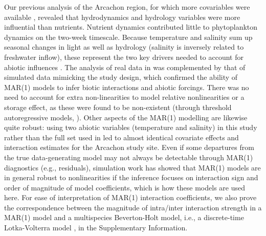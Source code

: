\documentclass[10pt]{article}
\begin{document}
Our previous analysis of the Arcachon region, for which more covariables were available \citep{barraquand_coastal_2018},
revealed that hydrodynamics and hydrology variables were more influential than nutrients. Nutrient dynamics
contributed little to phytoplankton dynamics on the two-week timescale.
Because temperature and salinity sum up seasonal changes in light
as well as hydrology (salinity is inversely related to freshwater
inflow), these represent the two key drivers needed to account for
abiotic influences \citep{scheef_inferring_2013}. The analysis of
real data in \citet{barraquand_coastal_2018} was complemented by
that of simulated data mimicking the study design, which confirmed
the ability of MAR(1) models to infer biotic interactions and abiotic
forcings. There was no need to account for extra non-linearities to
model relative nonlinearities or a storage effect, as these were found
to be non-existent (through threshold autoregressive models, \citealp{barraquand_coastal_2018}).
Other aspects of the MAR(1) modelling are likewise quite robust: using
two abiotic variables (temperature and salinity) in this study rather
than the full set used in \citet{barraquand_coastal_2018} led to
almost identical covariate effects and interaction estimates for the
Arcachon study site. Even if some departures from the true data-generating
model may not always be detectable through MAR(1) diagnostics (e.g.,
residuals), simulation work has showed that MAR(1) models are in general
robust to nonlinearities \citep{certain_how_2018} if the inference
focuses on interaction sign and order of magnitude of model coefficients,
which is how these models are used here. For
ease of interpretation of MAR(1) interaction coefficients, we also
prove the correspondence between the magnitude of intra/inter interaction
strength in a MAR(1) model and a multispecies Beverton-Holt model,
i.e., a discrete-time Lotka-Volterra model \citep{cushing_discrete_2004},
in the Supplementary Information.
\end{document}
